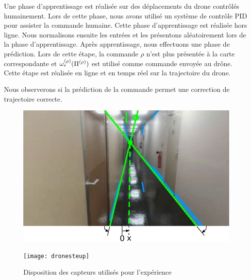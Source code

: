 \documentclass[../main]{subfiles}
\begin{document}
Une phase d'apprentissage est réalisée sur des déplacements du drone contrôlés humainement. Lors de cette phase, nous avons utilisé un système de contrôle PID pour assister la commande humaine. 
Cette phase d'apprentissage est réalisée hors ligne. Nous normalisons ensuite les entrées et les présentons aléatoirement lors de la phase d'apprentissage.
Après apprentissage, nous effectuons une phase de prédiction. Lors de cette étape, la commande $\rho$ n'est plus présentée à la carte correspondante et $\omega_e^{({\rho})}(\Pi^{({\rho})})$ est utilisé comme commande envoyée au drône.
Cette étape est réalisée en ligne et en temps réel sur la trajectoire du drone.

Nous observerons si la prédiction de la commande permet une correction de trajectoire correcte.


\begin{figure}
	\begin{minipage}{0.5\textwidth}
	\includegraphics[width=\textwidth]{visudrone.pdf}
	\end{minipage}
	\begin{minipage}{0.5\textwidth}
	\texttt{[image: dronesteup]}
	\end{minipage}
	\caption{Disposition des capteurs utilisés pour l'expérience}
	\label{fig:drone}
	\end{figure}
\end{document}
